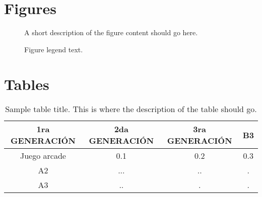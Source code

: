 \documentclass{bmcart}
\begin{document}
\begin{backmatter}

\section*{Figures}
  \begin{figure}[h!]
  \caption{
      A short description of the figure content
      should go here.}
      \end{figure}

\begin{figure}[h!]
  \caption{
      Figure legend text.}
      \end{figure}


\section*{Tables}
\begin{table}[h!]
	\caption{Sample table title. This is where the description of the table should go.}
	\begin{tabular}{cccc}
		\hline
		1ra GENERACIÓN& 2da GENERACIÓN  &3ra GENERACIÓN   & B3\\ \hline
		Juego arcade & 0.1 & 0.2 & 0.3\\
		A2 & ... & ..  & .\\
		A3 & ..  & .   & .\\ \hline
	\end{tabular}
\end{table}


\end{backmatter}
\end{document}
